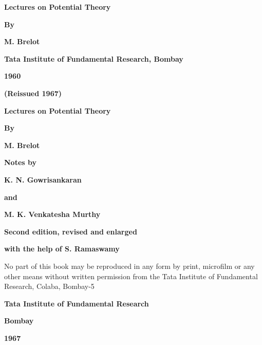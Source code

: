 \thispagestyle{empty}
\vfill

\begin{center}
{\Large\bf Lectures on Potential Theory}
\vskip 1cm

{\bf By}
\medskip

{\large\bf  M. Brelot}
\vfill

{\bf Tata Institute of Fundamental Research, Bombay}

{\bf 1960}

{\bf (Reissued 1967)}
\end{center}
\newpage



\thispagestyle{empty}
\begin{center}
{\Large\bf Lectures on Potential Theory}
\vskip 1cm 

{\bf By}
\medskip

{\large\bf M. Brelot}
\vfill

{\bf Notes by}
\medskip

{\large\bf K. N. Gowrisankaran}

{\bf and}

{\large\bf M. K. Venkatesha Murthy}
\vskip 1cm

{\bf Second edition, revised and enlarged}

{\bf with the help of S. Ramaswamy}

\vfill

\parbox{0.7\textwidth}{
No part of this book may be reproduced in any form by print, microfilm
or any other means without written permission from the Tata Institute
of Fundamental Research, Colaba, Bombay-5}
\vfill

{\bf Tata Institute of Fundamental Research}

{\bf Bombay}

{\bf 1967}
\end{center}
